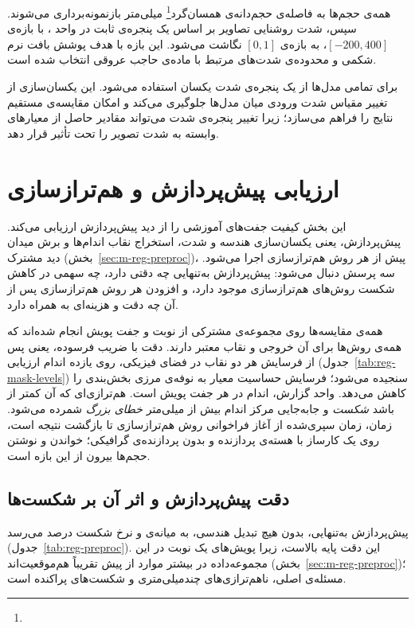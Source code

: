 همه‌ی حجم‌ها به فاصله‌ی حجم‌دانه‌ی همسان‌گرد\footnote{}  میلی‌متر بازنمونه‌برداری می‌شوند. سپس، شدت روشنایی تصاویر بر اساس یک پنجره‌ی ثابت در واحد ، با بازه‌ی $[-200,400]$، به بازه‌ی $[0,1]$ نگاشت می‌شود. این بازه با هدف پوشش بافت نرم شکمی و محدوده‌ی شدت‌های مرتبط با ماده‌ی حاجب عروقی انتخاب شده است.

برای تمامی مدل‌ها از یک پنجره‌ی شدت یکسان استفاده می‌شود. این یکسان‌سازی از تغییر مقیاس شدت ورودی میان مدل‌ها جلوگیری می‌کند و امکان مقایسه‌ی مستقیم نتایج را فراهم می‌سازد؛ زیرا تغییر پنجره‌ی شدت می‌تواند مقادیر حاصل از معیارهای وابسته به شدت تصویر را تحت تأثیر قرار دهد.


\section{ارزیابی پیش‌پردازش و هم‌ترازسازی}
\label{sec:e-reg}
\label{sec:e-setup-reg}
\label{sec:e-reg-frontend}
\label{sec:e-reg-design}

این بخش کیفیت جفت‌های آموزشی را از دید پیش‌پردازش ارزیابی می‌کند. پیش‌پردازش، یعنی یکسان‌سازی هندسه و شدت، استخراج نقاب اندام‌ها و برش میدان دید مشترک (بخش~\ref{sec:m-reg-preproc})، پیش از هر روش هم‌ترازسازی اجرا می‌شود. سه پرسش دنبال می‌شود: پیش‌پردازش به‌تنهایی چه دقتی دارد، چه سهمی در کاهش شکست روش‌های هم‌ترازسازی موجود دارد، و افزودن هر روش هم‌ترازسازی پس از آن چه دقت و هزینه‌ای به همراه دارد.

همه‌ی مقایسه‌ها روی مجموعه‌ی مشترکی از  نوبت و  جفت پویش انجام شده‌اند که همه‌ی روش‌ها برای آن خروجی و نقاب معتبر دارند. دقت با ضریب  فرسوده، یعنی  پس از فرسایش هر دو نقاب در فضای فیزیکی، روی یازده اندام ارزیابی (جدول~\ref{tab:reg-mask-levels}) سنجیده می‌شود؛ فرسایش حساسیت معیار به نوفه‌ی مرزی بخش‌بندی را کاهش می‌دهد. واحد گزارش، اندام در هر جفت پویش است. هم‌ترازی‌ای که  آن کمتر از  باشد \emph{شکست} و جابه‌جایی مرکز اندام بیش از  میلی‌متر \emph{خطای بزرگ} شمرده می‌شود. زمان، زمان سپری‌شده از آغاز فراخوانی روش هم‌ترازسازی تا بازگشت نتیجه است، روی یک کارساز با  هسته‌ی پردازنده و بدون پردازنده‌ی گرافیکی؛ خواندن و نوشتن حجم‌ها بیرون از این بازه است.

\subsection{دقت پیش‌پردازش و اثر آن بر شکست‌ها}

پیش‌پردازش به‌تنهایی، بدون هیچ تبدیل هندسی، به میانه‌ی   و نرخ شکست  درصد می‌رسد (جدول~\ref{tab:reg-preproc}). این دقت پایه بالاست، زیرا پویش‌های یک نوبت در این مجموعه‌داده در بیشتر موارد از پیش تقریباً هم‌موقعیت‌اند (بخش~\ref{sec:m-reg-preproc})؛ مسئله‌ی اصلی، ناهم‌ترازی‌های چندمیلی‌متری و شکست‌های پراکنده است.

